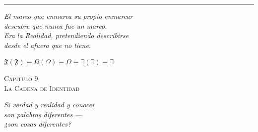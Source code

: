 \documentclass[10pt, openany, oneside]{book}
\renewcommand{\large}{\fontsize{11.5}{14}\selectfont}
\renewcommand{\huge}{\fontsize{17}{21}\selectfont}
\begin{document}
\vspace{2em}

\begin{center}
    \rule{0.15\textwidth}{0.3pt}
\end{center}

\vspace{0.5em}

\begin{center}
    \itshape
    El marco que enmarca su propio enmarcar\\
    descubre que nunca fue un marco.\\[0.8em]
    Era la Realidad, pretendiendo describirse\\
    desde el afuera que no tiene.
\end{center}

\vspace{0.5em}

\begin{center}
    $\mathfrak{F}(\mathfrak{F}) \equiv \Omega(\Omega) \equiv \Omega \equiv \exists(\exists) \equiv \exists$
\end{center}

%
%
%
%

\newpage

\begin{center}
    {\huge\scshape Capítulo 9}\\[0.3em]
    {\large\scshape La Cadena de Identidad}
\end{center}

\vspace{1.5em}

\begin{center}
    \itshape
    Si verdad y realidad y conocer\\
    son palabras diferentes ---\\
    ¿son cosas diferentes?
\end{center}

\vspace{2em}
\end{document}
